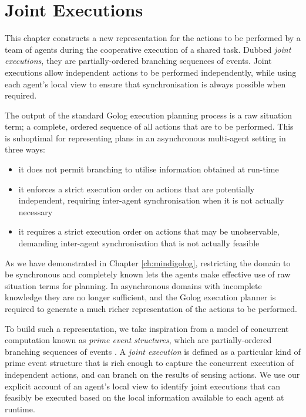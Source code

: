 

\chapter{Joint Executions}

\label{ch:jointexec}

This chapter constructs a new representation for the actions to be
performed by a team of agents during the cooperative execution of
a shared task. Dubbed \emph{joint executions}, they are partially-ordered
branching sequences of events. Joint executions allow independent
actions to be performed independently, while using each agent's local
view to ensure that synchronisation is always possible when required.

The output of the standard Golog execution planning process is a raw
situation term; a complete, ordered sequence of all actions that are
to be performed. This is suboptimal for representing plans in an asynchronous
multi-agent setting in three ways:

\begin{itemize}
\item it does not permit branching to utilise information obtained at run-time 
\item it enforces a strict execution order on actions that are potentially
independent, requiring inter-agent synchronisation when it is not
actually necessary 
\item it requires a strict execution order on actions that may be unobservable,
demanding inter-agent synchronisation that is not actually feasible 
\end{itemize}
As we have demonstrated in Chapter \ref{ch:mindigolog}, restricting
the domain to be synchronous and completely known lets the agents
make effective use of raw situation terms for planning. In asynchronous
domains with incomplete knowledge they are no longer sufficient, and
the Golog execution planner is required to generate a much richer
representation of the actions to be performed.

To build such a representation, we take inspiration from a model of
concurrent computation known as \emph{prime event} \emph{structures},
which are partially-ordered branching sequences of events \citep{npw79event_structures}.
A \emph{joint execution} is defined as a particular kind of prime
event structure that is rich enough to capture the concurrent execution
of independent actions, and can branch on the results of sensing actions.
We use our explicit account of an agent's local view to identify joint
executions that can feasibly be executed based on the local information
available to each agent at runtime.

